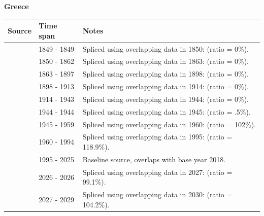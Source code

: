 \documentclass[12pt,a4paper,landscape]{article}
\begin{document}
\begin{adjustbox}{max totalsize={\paperwidth}{\paperheight},center}
\begin{minipage}[t][\textheight][t]{\textwidth}
\vspace*{0.5cm}
{}
\begin{center}
{\Large\bfseries Greece}
\end{center}
\vspace{0.5cm}
\begin{table}[H]
\centering
\small
\begin{tabular}{|l|l|l|}
\hline
\textbf{Source} & \textbf{Time span} & \textbf{Notes} \\
\hline
\rowcolor{white}\cite{Mitchell}& 1849 - 1849 &Spliced using overlapping data in 1850: (ratio = 0\%).\\
\rowcolor{lightgray}\cite{Tena}& 1850 - 1862 &Spliced using overlapping data in 1863: (ratio = 0\%).\\
\rowcolor{white}\cite{Mitchell}& 1863 - 1897 &Spliced using overlapping data in 1898: (ratio = 0\%).\\
\rowcolor{lightgray}\cite{Tena}& 1898 - 1913 &Spliced using overlapping data in 1914: (ratio = 0\%).\\
\rowcolor{white}\cite{Mitchell}& 1914 - 1943 &Spliced using overlapping data in 1944: (ratio = 0\%).\\
\rowcolor{lightgray}\cite{NBS}& 1944 - 1944 &Spliced using overlapping data in 1945: (ratio = .5\%).\\
\rowcolor{white}\cite{Mitchell}& 1945 - 1959 &Spliced using overlapping data in 1960: (ratio = 102\%).\\
\rowcolor{lightgray}\cite{AMECO}& 1960 - 1994 &Spliced using overlapping data in 1995: (ratio = 118.9\%).\\
\rowcolor{white}\cite{OECD_EO}& 1995 - 2025 &Baseline source, overlaps with base year 2018.\\
\rowcolor{lightgray}\cite{AMECO}& 2026 - 2026 &Spliced using overlapping data in 2027: (ratio = 99.1\%).\\
\rowcolor{white}\cite{IMF_WEO_forecast}& 2027 - 2029 &Spliced using overlapping data in 2030: (ratio = 104.2\%).\\
\hline
\end{tabular}
\end{table}
\begin{figure}[H]
\centering

\end{figure}
\end{minipage}
\end{adjustbox}
\end{document}
